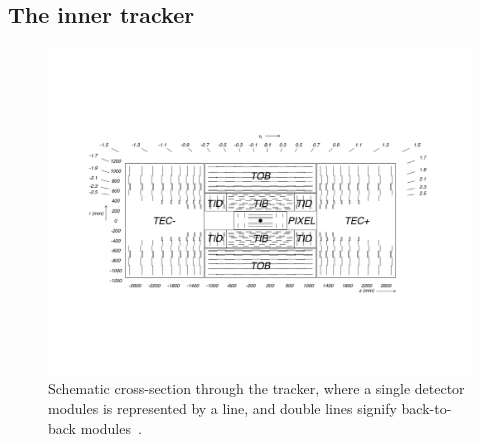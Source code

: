 \subsection{The inner tracker}
\label{subsec:tracker}

\begin{figure}
  \centering
  \includegraphics[width=\textwidth]{figs/tracker_schematic.pdf}
  \caption{Schematic cross-section through the \CMS tracker, where a single detector modules is represented by a line, and double lines signify back-to-back modules~\cite{CMS:1998aa}.}
  \label{fig:trackerxsec}
\end{figure}

